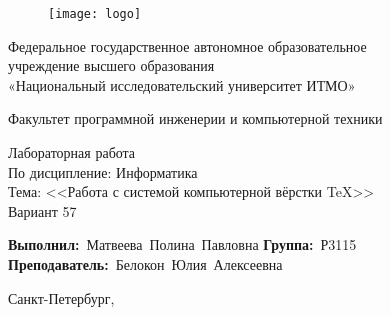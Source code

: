 \newcommand{\Faculty}{Факультет программной инженерии и компьютерной техники}
\newcommand{\TeacherName}{Белокон Юлия Алексеевна}

\newcommand{\LabSubject}{Информатика}
\newcommand{\LabNumber}{\textnumero 6}
\newcommand{\LabName}{Работа с системой компьютерной вёрстки \TeX}
\newcommand{\Variant}{57}

\newcommand{\StudentGroup}{Р3115}
\newcommand{\StudentName}{Матвеева Полина Павловна}


\thispagestyle{empty}

\begin{figure}[h]
	\centering
	\texttt{[image: logo]}
\end{figure}
\vspace{-\baselineskip}


\begin{center}
	Федеральное государственное автономное образовательное \\
	учреждение высшего образования\\
	«Национальный исследовательский университет ИТМО»
\end{center}\par

\begin{center}
	\vspace{12pt}
	\Faculty
\end{center}\par

\vspace{\fill}
\begin{center}
	Лабораторная работа \LabNumber \\
	По дисципление: \LabSubject \\
	Тема: <<\LabName>> \\
	Вариант \Variant
\end{center}\par

\vspace{\fill}
\vbox{
	\hfill
	\vbox{
		\hbox{\textbf{Выполнил:} \StudentName}
		\hbox{\textbf{Группа:} \StudentGroup \\}
		\hbox{\textbf{Преподаватель:} \TeacherName}
	}
} 


\vspace{\fill}
\begin{center}
	Санкт-Петербург, \the\year{}
\end{center}\par

\newpage